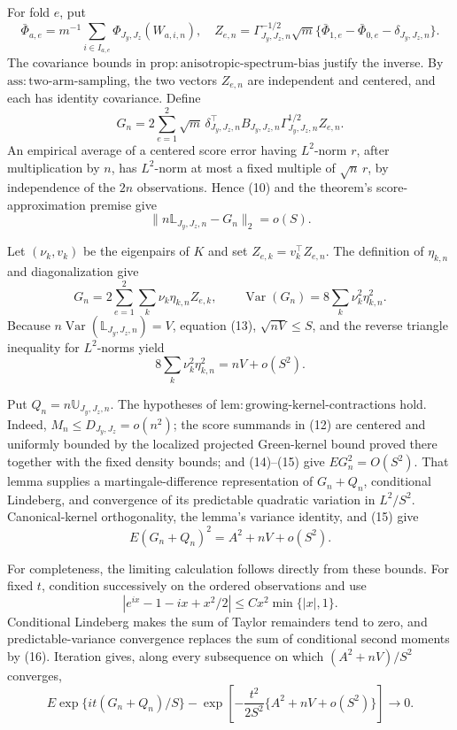 For fold \(e\), put
\[
\bar\Phi_{a,e}=m^{-1}\sum_{i\in I_{a,e}}\Phi_{J_y,J_z}(W_{a,i,n}),
\quad
Z_{e,n}=\Gamma_{J_y,J_z,n}^{-1/2}\sqrt m
\{\bar\Phi_{1,e}-\bar\Phi_{0,e}-\delta_{J_y,J_z,n}\}. \tag{11}
\]
The covariance bounds in \(\mathrm{prop{:}anisotropic\text{-}spectrum\text{-}bias}\) justify the inverse. By \(\mathrm{ass{:}two\text{-}arm\text{-}sampling}\), the two vectors \(Z_{e,n}\) are independent and centered, and each has identity covariance. Define
\[
G_n=2\sum_{e=1}^2\sqrt m\,
\delta_{J_y,J_z,n}^{\top}B_{J_y,J_z,n}
\Gamma_{J_y,J_z,n}^{1/2}Z_{e,n}. \tag{12}
\]
An empirical average of a centered score error having \(L^2\)-norm \(r\), after multiplication by \(n\), has \(L^2\)-norm at most a fixed multiple of \(\sqrt n\,r\), by independence of the \(2n\) observations. Hence (10) and the theorem's score-approximation premise give
\[
\|n\mathbb L_{J_y,J_z,n}-G_n\|_2=o(S). \tag{13}
\]

Let \((\nu_k,v_k)\) be the eigenpairs of \(K\) and set \(Z_{e,k}=v_k^{\top}Z_{e,n}\). The definition of \(\eta_{k,n}\) and diagonalization give
\[
G_n=2\sum_{e=1}^2\sum_k\nu_k\eta_{k,n}Z_{e,k},
\qquad
\operatorname{Var}(G_n)=8\sum_k\nu_k^2\eta_{k,n}^2. \tag{14}
\]
Because \(n\operatorname{Var}(\mathbb L_{J_y,J_z,n})=V\), equation (13), \(\sqrt{nV}\le S\), and the reverse triangle inequality for \(L^2\)-norms yield
\[
8\sum_k\nu_k^2\eta_{k,n}^2=nV+o(S^2). \tag{15}
\]

Put \(Q_n=n\mathbb U_{J_y,J_z,n}\). The hypotheses of \(\mathrm{lem{:}growing\text{-}kernel\text{-}contractions}\) hold. Indeed, \(M_n\le D_{J_y,J_z}=o(n^2)\); the score summands in (12) are centered and uniformly bounded by the localized projected Green-kernel bound proved there together with the fixed density bounds; and (14)--(15) give \(EG_n^2=O(S^2)\). That lemma supplies a martingale-difference representation of \(G_n+Q_n\), conditional Lindeberg, and convergence of its predictable quadratic variation in \(L^2/S^2\). Canonical-kernel orthogonality, the lemma's variance identity, and (15) give
\[
E(G_n+Q_n)^2=A^2+nV+o(S^2). \tag{16}
\]

For completeness, the limiting calculation follows directly from these bounds. For fixed \(t\), condition successively on the ordered observations and use
\[
|e^{ix}-1-ix+x^2/2|\le Cx^2\min\{|x|,1\}.
\]
Conditional Lindeberg makes the sum of Taylor remainders tend to zero, and predictable-variance convergence replaces the sum of conditional second moments by (16). Iteration gives, along every subsequence on which \((A^2+nV)/S^2\) converges,
\[
E\exp\{it(G_n+Q_n)/S\}
-\exp\!\left[-\frac{t^2}{2S^2}\{A^2+nV+o(S^2)\}\right]\longrightarrow0. \tag{17}
\]

